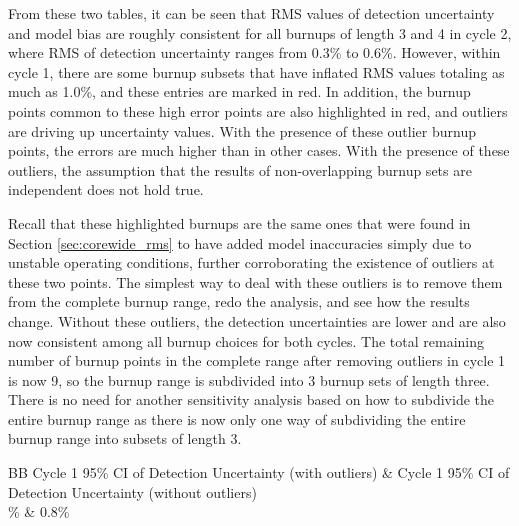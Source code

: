 \documentclass{article}
\begin{document}
From these two tables, it can be seen that RMS values of detection uncertainty and model bias are roughly consistent for all burnups of length 3 and 4 in cycle 2, where RMS of detection uncertainty ranges from 0.3\% to 0.6\%. However, within cycle 1, there are some burnup subsets that have inflated RMS values totaling as much as 1.0\%, and these entries are marked in red. In addition, the burnup points common to these high error points are also highlighted in red, and outliers are driving up uncertainty values. With the presence of these outlier burnup points, the errors are much higher than in other cases. With the presence of these outliers, the assumption that the results of non-overlapping burnup sets are independent does not hold true.

Recall that these highlighted burnups are the same ones that were found in Section \ref{sec:corewide_rms} to have added model inaccuracies simply due to unstable operating conditions, further corroborating the existence of outliers at these two points. The simplest way to deal with these outliers is to remove them from the complete burnup range, redo the analysis, and see how the results change. Without these outliers, the detection uncertainties are lower and are also now consistent among all burnup choices for both cycles. The total remaining number of burnup points in the complete range after removing outliers in cycle 1 is now 9, so the burnup range is subdivided into 3 burnup sets of length three. There is no need for another sensitivity analysis based on how to subdivide the entire burnup range as there is now only one way of subdividing the entire burnup range into subsets of length 3.

\begin{table}[!htb]
  \centering
  \begin{tabular}{BB}\toprule
     Cycle 1 95\% CI of \newline Detection Uncertainty \newline (with outliers)  & Cycle 1 95\% CI of \newline Detection Uncertainty \newline (without outliers) \\ \% & 0.8\% \\ \bottomrule
  \end{tabular}
  \caption{Cycle 1 95\% CI of detection uncertainty with and without outliers at 1.02 and 9.80 MWd/kg.}
  \label{table:cassim_results_updated}
\end{table}
\end{document}
